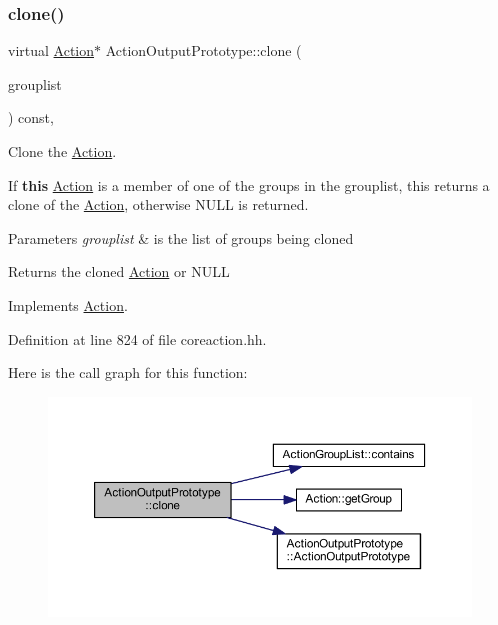 \subsubsection{\texorpdfstring{clone()}{clone()}}
{\footnotesize\ttfamily virtual \mbox{\hyperlink{class_action}{Action}}$\ast$ Action\+Output\+Prototype\+::clone (\begin{DoxyParamCaption}\item[{const \mbox{\hyperlink{class_action_group_list}{Action\+Group\+List}} \&}]{grouplist }\end{DoxyParamCaption}) const\hspace{0.3cm}{\ttfamily [inline]}, {\ttfamily [virtual]}}



Clone the \mbox{\hyperlink{class_action}{Action}}. 

If {\bfseries{this}} \mbox{\hyperlink{class_action}{Action}} is a member of one of the groups in the grouplist, this returns a clone of the \mbox{\hyperlink{class_action}{Action}}, otherwise N\+U\+LL is returned. 
\begin{DoxyParams}{Parameters}
{\em grouplist} & is the list of groups being cloned \\
\hline
\end{DoxyParams}
\begin{DoxyReturn}{Returns}
the cloned \mbox{\hyperlink{class_action}{Action}} or N\+U\+LL 
\end{DoxyReturn}


Implements \mbox{\hyperlink{class_action_af8242e41d09e5df52f97df9e65cc626f}{Action}}.



Definition at line 824 of file coreaction.\+hh.

Here is the call graph for this function\+:
\nopagebreak
\begin{figure}[H]
\begin{center}
\leavevmode
\includegraphics[width=350pt]{class_action_output_prototype_abaa0684e2d727f785d3e45e091da5dd1_cgraph}
\end{center}
\end{figure}


